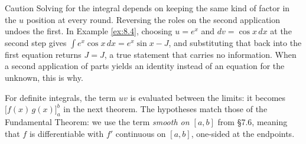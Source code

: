 \documentclass[a4paper,12pt,oneside]{memoir}
\begin{document}
\begin{envcaution}{Caution}{}{}
Solving for the integral depends on keeping the same kind of factor in the \(u\) position at every round. Reversing the roles on the second application undoes the first. In Example \ref{ex:8.4}, choosing \(u = e^{x}\) and \(dv = \cos x\,dx\) at the second step gives \(\int e^{x}\cos x\,dx = e^{x}\sin x - J\), and substituting that back into the first equation returns \(J = J\), a true statement that carries no information. When a second application of parts yields an identity instead of an equation for the unknown, this is why.
\end{envcaution}
For definite integrals, the term \(uv\) is evaluated between the limits: it becomes \(\bigl[f(x)\,g(x)\bigr]_{a}^{b}\) in the next theorem. The hypotheses match those of the Fundamental Theorem: we use the term \emph{smooth on \([a, b]\)} from §7.6, meaning that \(f\) is differentiable with \(f'\) continuous on \([a, b]\), one-sided at the endpoints.
\end{document}
